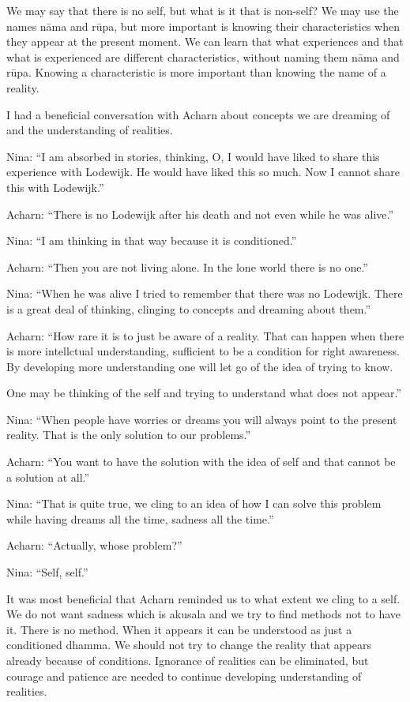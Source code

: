 We may say that there is no self, but what is it that is non-self? We
may use the names nāma and rūpa, but more important is knowing their
characteristics when they appear at the present moment. We can learn
that what experiences and that what is experienced are different
characteristics, without naming them nāma and rūpa. Knowing a
characteristic is more important than knowing the name of a reality.

I had a beneficial conversation with Acharn about concepts we are
dreaming of and the understanding of realities.

Nina: ``I am absorbed in stories, thinking, O, I would have liked to
share this experience with Lodewijk. He would have liked this so much.
Now I cannot share this with Lodewijk.''

Acharn: ``There is no Lodewijk after his death and not even while he was
alive.''

Nina: ``I am thinking in that way because it is conditioned.''

Acharn: ``Then you are not living alone. In the lone world there is no
one.''

Nina: ``When he was alive I tried to remember that there was no
Lodewijk. There is a great deal of thinking, clinging to concepts and
dreaming about them.''

Acharn: ``How rare it is to just be aware of a reality. That can happen
when there is more intellctual understanding, sufficient to be a
condition for right awareness. By developing more understanding one will
let go of the idea of trying to know.

One may be thinking of the self and trying to understand what does not
appear.''

Nina: ``When people have worries or dreams you will always point to the
present reality. That is the only solution to our problems.''

Acharn: ``You want to have the solution with the idea of self and that
cannot be a solution at all.''

Nina: ``That is quite true, we cling to an idea of how I can solve this
problem while having dreams all the time, sadness all the time.''

Acharn: ``Actually, whose problem?''

Nina: ``Self, self.''

It was most beneficial that Acharn reminded us to what extent we cling
to a self. We do not want sadness which is akusala and we try to find
methods not to have it. There is no method. When it appears it can be
understood as just a conditioned dhamma. We should not try to change the
reality that appears already because of conditions. Ignorance of
realities can be eliminated, but courage and patience are needed to
continue developing understanding of realities.

